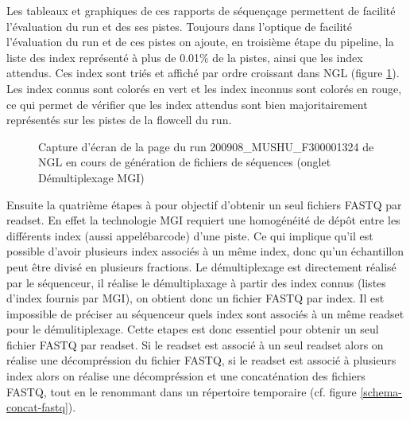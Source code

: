 Les tableaux et graphiques de ces rapports de séquençage permettent de facilité l'évaluation du run et des ses pistes.
Toujours dans l'optique de facilité l'évaluation du run et de ces pistes on ajoute, en troisième étape du pipeline, la liste des index représenté à plus de 0.01\% de la pistes, ainsi que les index attendus.
Ces index sont triés et affiché par ordre croissant dans NGL (figure \ref{top-index}).
Les index connus sont colorés en vert et les index inconnus sont colorés en rouge, ce qui permet de vérifier que les index attendus sont bien majoritairement représentés sur les pistes de la flowcell du run.

\begin{figure}[H]
    \centering
    \caption{\footnotesize{Capture d'écran de la page du run 200908\_MUSHU\_F300001324 de NGL en cours de génération de fichiers de séquences (onglet \og Démultiplexage MGI\fg{})}}
    \label{top-index}
\end{figure}

Ensuite la quatrième étapes à pour objectif d'obtenir un seul fichiers FASTQ par readset.
En effet la technologie MGI requiert une homogénéité de dépôt entre les différents index (aussi appelé\og barcode\fg{}) d'une piste.
Ce qui implique qu'il est possible d'avoir plusieurs index associés à un même index, donc qu'un échantillon peut être divisé en plusieurs fractions.
Le démultiplexage est directement réalisé par le séquenceur, il réalise le démultiplaxage à partir des index connus (listes d'index fournis par MGI), on obtient donc un fichier FASTQ par index. Il est impossible de préciser au séquenceur quels index sont associés à un même readset pour le démulitiplexage.
Cette etapes est donc essentiel pour obtenir un seul fichier FASTQ par readset.
Si le readset est associé à un seul readset alors on réalise une décompréssion du fichier FASTQ, si le readset est associé à plusieurs index alors on réalise une décompréssion et une concaténation des fichiers FASTQ, tout en le renommant dans un répertoire temporaire (cf. figure \ref{schema-concat-fastq}).

